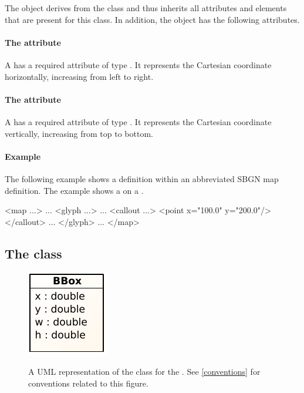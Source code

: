 The \Point object derives from the \SbgnBase class and thus inherits all
attributes and elements that are present for this class.
In addition, the \Point object has the following attributes.

\paragraph{The \fixttspace{} attribute}

A \Point has a required attribute  of type . It represents the Cartesian  coordinate horizontally, increasing from left to right.


\paragraph{The \fixttspace{} attribute}

A \Point has a required attribute  of type . It represents the Cartesian  coordinate vertically, increasing from top to bottom.

\paragraph{Example}

The following example shows a \Point definition within an abbreviated SBGN map definition. The example shows a \Point on a \Callout.

\begin{example}
<map ...>
    ...
    <glyph ...>
        ...
        <callout ...>
            <point x="100.0" y="200.0"/>
        </callout>
        ...
    </glyph>
    ...
</map>
\end{example}


\subsection{The  class}
\label{bbox-class}

\begin{figure}[ht!]
  \centering
  \includegraphics[scale=1.0]{figures/sbgnml_bbox_uml.pdf}\\
\caption{A UML representation of the \BBox class for the \SbgnmlPackage.
See \ref{conventions} for conventions related to this figure. }
  \label{fig:sbgnml_bbox_uml}
\end{figure}


